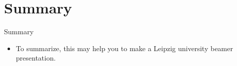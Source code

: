 \section{Summary}
\begin{frame}{Summary}
\begin{itemize}
    \item To summarize, this may help you to make a Leipzig university beamer presentation.
\end{itemize}
\end{frame}